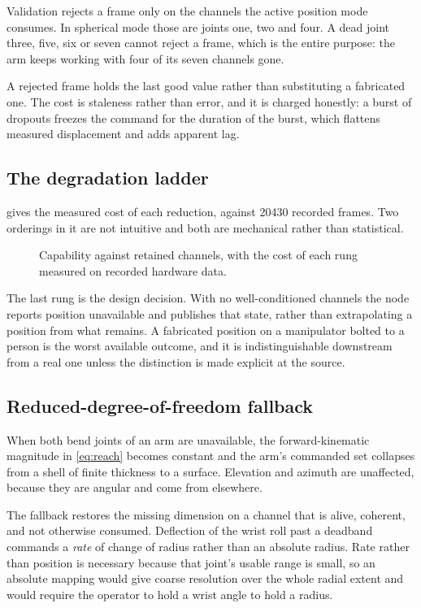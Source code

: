 Validation rejects a frame only on the channels the active position mode
consumes. In spherical mode those are joints one, two and four. A dead joint
three, five, six or seven cannot reject a frame, which is the entire purpose:
the arm keeps working with four of its seven channels gone.

A rejected frame holds the last good value rather than substituting a
fabricated one. The cost is staleness rather than error, and it is charged
honestly: a burst of dropouts freezes the command for the duration of the
burst, which flattens measured displacement and adds apparent lag.

\subsection{The degradation ladder}

 gives the measured cost of each reduction, against
\num{20430} recorded frames. Two orderings in it are not intuitive and both
are mechanical rather than statistical.

\begin{figure}[htbp]
  \centering
  
  \caption[Degradation ladder]{Capability against retained channels, with the
  cost of each rung measured on recorded hardware data.}
  \label{fig:degradation}
\end{figure}

The last rung is the design decision. With no well-conditioned channels the
node reports position unavailable and publishes that state, rather than
extrapolating a position from what remains. A fabricated position on a
manipulator bolted to a person is the worst available outcome, and it is
indistinguishable downstream from a real one unless the distinction is made
explicit at the source.

\subsection{Reduced-degree-of-freedom fallback}

When both bend joints of an arm are unavailable, the forward-kinematic
magnitude in \cref{eq:reach} becomes constant and the arm's commanded set
collapses from a shell of finite thickness to a surface. Elevation and azimuth
are unaffected, because they are angular and come from elsewhere.

The fallback restores the missing dimension on a channel that is alive,
coherent, and not otherwise consumed. Deflection of the wrist roll past a
deadband commands a \emph{rate} of change of radius rather than an absolute
radius. Rate rather than position is necessary because that joint's usable
range is small, so an absolute mapping would give coarse resolution over the
whole radial extent and would require the operator to hold a wrist angle to
hold a radius.

